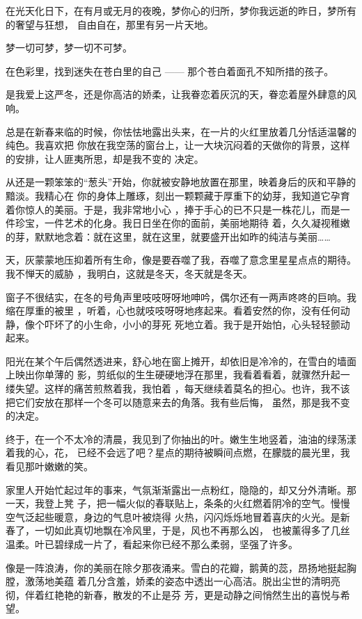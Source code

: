 \documentclass[12pt,a4paper]{article}
\begin{document}
		在光天化日下，在有月或无月的夜晚，梦你心的归所，梦你我远逝的昨日，梦所有的奢望与狂想，
	自由自在，那里有另一片天地。

		梦一切可梦，梦一切不可梦。

		在色彩里，找到迷失在苍白里的自己 —— 那个苍白着面孔不知所措的孩子。

	\endwriting



		是我爱上这严冬，还是你高洁的娇柔，让我眷恋着灰沉的天，眷恋着屋外肆意的风响。

		总是在新春来临的时候，你怯怯地露出头来，在一片的火红里放着几分恬适温馨的纯色。我喜欢把
	你放在我空荡的窗台上，让一大块沉闷着的天做你的背景，这样的安排，让人匪夷所思，却是我不变的
	决定。

		从还是一颗笨笨的“葱头”开始，你就被安静地放置在那里，映着身后的灰和平静的黯淡。我精心在
	你的身体上雕琢，刻出一颗颗藏于厚重下的幼芽，我知道它孕育着你惊人的美丽。于是，我非常地小心
	，捧于手心的已不只是一株花儿，而是一件珍宝，一件艺术的化身。我日日坐在你的面前，美丽地期待
	着，久久凝视稚嫩的芽，默默地念着：就在这里，就在这里，就要盛开出如昨的纯洁与美丽……

		天，灰蒙蒙地压抑着所有生命，像是要吞噬了我，吞噬了意念里星星点点的期待。我不惮天的威胁
	，我明白，这就是冬天，冬天就是冬天。

		窗子不很结实，在冬的号角声里吱吱呀呀地呻吟，偶尔还有一两声咚咚的巨响。我缩在厚重的被里
	，听着，心也就吱吱呀呀地疼起来。看着安然的你，没有任何动静，像个吓坏了的小生命，小小的芽死
	死地立着。我于是开始怕，心头轻轻颤动起来。

		阳光在某个午后偶然透进来，舒心地在窗上摊开，却依旧是冷冷的，在雪白的墙面上映出你单薄的
	影，剪纸似的生生硬硬地浮在那里，我看着看着，就骤然升起一缕失望。这样的痛苦煎熬着我，我怕着
	，每天继续着莫名的担心。也许，我不该把它们安放在那样一个冬可以随意来去的角落。我有些后悔，
	虽然，那是我不变的决定。

		终于，在一个不太冷的清晨，我见到了你抽出的叶。嫩生生地竖着，油油的绿荡漾着我的心，花，
	已经不会远了吧？星点的期待被瞬间点燃，在朦胧的晨光里，我看见那叶嫩嫩的笑。

		家里人开始忙起过年的事来，气氛渐渐露出一点粉红，隐隐的，却又分外清晰。那一天，我登上凳
	子，把一幅火似的春联贴上，条条的火红燃着阴冷的空气。慢慢空气泛起些暖意，身边的气息叶被烧得
	火热，闪闪烁烁地冒着喜庆的火光。是新春了，一切如此真切地飘在冷风里，于是，风也不再那么凶，
	也被薰得多了几丝温柔。叶已碧绿成一片了，看起来你已经不那么柔弱，坚强了许多。

		像是一阵浪涛，你的美丽在除夕那夜涌来。雪白的花瓣，鹅黄的蕊，昂扬地挺起胸膛，激荡地美蕴
	着几分含羞，娇柔的姿态中透出一心高洁。脱出尘世的清明亮彻，伴着红艳艳的新春，散发的不止是芬
	芳，更是动静之间悄然生出的喜悦与希望。
\end{document}

